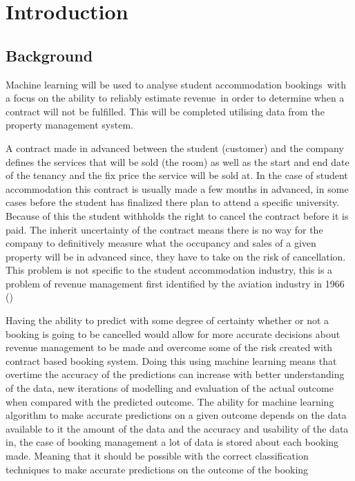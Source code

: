\chapter{Introduction}

\section{Background}

Machine learning will be used to analyse student accommodation bookings with a focus on the ability to reliably estimate revenue in order to determine when a contract will not be fulfilled. This will be completed utilising data from the property management system. \cite{Jain2006IntellectualPerspective}

\vspace{5mm}

A contract made in advanced between the student (customer) and the company defines the services that will be sold (the room) as well as the start and end date of the tenancy and the fix price the service will be sold at. In the case of student accommodation this contract is usually made a few months in advanced, in some cases before the student has finalized there plan to attend a specific university. Because of this the student withholds the right to cancel the contract before it is paid. The inherit uncertainty of the contract means there is no way for the company to definitively measure what the occupancy and sales of a given property will be in advanced since, they have to take on the risk of cancellation. This problem is not specific to the student accommodation industry, this is a problem of revenue management first identified by the aviation industry in 1966  (\cite{Chiang2007AnResearch})

\vspace{5mm}


Having the ability to predict with some degree of certainty whether or not a booking is going to be cancelled would allow for more accurate decisions about revenue management to be made and overcome some of the risk created with contract based booking system. Doing this using machine learning means that overtime the accuracy of the predictions can increase with better understanding of the data, new iterations of modelling and evaluation of the actual outcome when compared with the predicted outcome. The ability for machine learning algorithm to make accurate predictions on a given outcome depends on the data available to it the amount of the data and the accuracy and usability of the data in, the case of booking management a lot of data is stored about each booking made. Meaning that it should be possible with the correct classification techniques to make accurate predictions on the outcome of the booking



